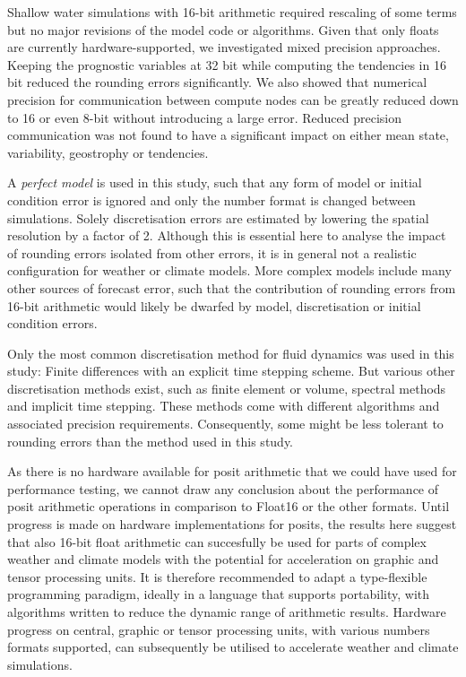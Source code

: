 \documentclass[draft]{agujournal2019}
\begin{document}
Shallow water simulations with 16-bit arithmetic required rescaling of some terms
but no major revisions of the model code or algorithms. Given that only floats are
currently hardware-supported, we investigated mixed precision approaches.
Keeping the prognostic variables at 32 bit while computing the tendencies in 16 bit
reduced the rounding errors significantly. We also showed that numerical precision
for communication between compute nodes can be greatly reduced down to 16 or
even 8-bit without introducing a large error. Reduced precision communication was
not found to have a significant impact on either mean state, variability,
geostrophy or tendencies.

A \emph{perfect model} is used in this study, such that any form
of model or initial condition error is ignored and only the number format is
changed between simulations. Solely discretisation errors are estimated by
lowering the spatial resolution by a factor of 2. Although this is essential
here to analyse the impact of rounding errors isolated from other errors, it
is in general not a realistic configuration for weather or climate models. More
complex models include many other sources of forecast error, such that the
contribution of rounding errors from 16-bit arithmetic would likely be dwarfed by
model, discretisation or initial condition errors.

Only the most common discretisation method for fluid dynamics was used in
this study: Finite differences with an explicit time stepping scheme. But various
other discretisation methods exist, such as finite element or volume, spectral
methods and implicit time stepping. These methods come with different algorithms
and associated precision requirements. Consequently, some might be
less tolerant to rounding errors than the method used in this study.

As there is no hardware available for posit arithmetic that we could have used
for performance testing, we cannot draw any conclusion about the performance of
posit arithmetic operations in comparison to Float16 or the other formats.
Until progress is made on hardware implementations for posits, the results here
suggest that also 16-bit float arithmetic can succesfully be used for parts of
complex weather and climate models with the potential for acceleration on graphic
and tensor processing units. It is therefore recommended to adapt a type-flexible
programming paradigm, ideally in a language that supports portability, with
algorithms written to reduce the dynamic range of arithmetic results. Hardware
progress on central, graphic or tensor processing units, with various numbers
formats supported, can subsequently be utilised to accelerate weather and
climate simulations.
\end{document}
